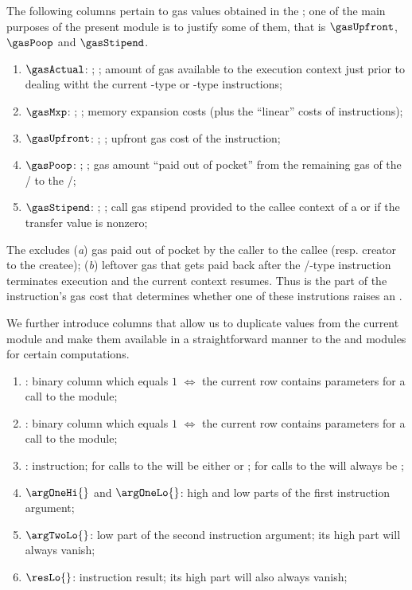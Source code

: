 The following columns pertain to gas values obtained in the \hubMod{};
one of the main purposes of the present module is to justify some of them, that is
$\gasUpfront$, $\gasPoop$ and $\gasStipend$.
\begin{enumerate}[resume]
	\item $\gasActual$: \godGiven{};
		\ccc{}; amount of gas available to the execution context just prior to dealing witht the current -type or -type instructions;
	\item $\gasMxp$: \godGiven{};
		\ccc{}; memory expansion costs (plus the ``linear'' costs of  instructions);
	\item $\gasUpfront$: \godGiven{};
		\ccc{}; upfront gas cost of the instruction;
	\item $\gasPoop$: \godGiven{};
		\ccc{}; gas amount ``paid out of pocket'' from the remaining gas of the \callerr{}/\creator{} to the \calleee{}/\createe{};	
	\item $\gasStipend$: \godGiven{};
		\ccc{}; call gas stipend provided to the callee context of a  or  if the transfer value is nonzero; 
\end{enumerate}
\saNote{}
The \gasUpfront{} excludes
(\emph{a}) gas paid out of pocket by the caller to the callee (resp. creator to the createe);
(\emph{b}) leftover gas that gets paid back after the /-type instruction terminates execution and the current context resumes.
Thus \gasUpfront{} is the part of the instruction's gas cost that determines whether one of these instrutions raises an \oogxSH{}.

We further introduce columns that allow us to duplicate values from the current module and make them available in a straightforward manner to the \wcpMod{} and \modMod{} modules for certain computations.
\begin{enumerate}[resume]
	\item \wcpLookupFlag{}:
		binary column which equals $1$ $\iff$ the current row contains parameters for a call to the \wcpMod{} module;
	\item \divLookupFlag{}:
		binary column which equals $1$ $\iff$ the current row contains parameters for a call to the \modMod{} module;
	\item \exoInst{}:
		instruction; for calls to the \wcpMod{} will be either  or ; for calls to the \modMod{} will always be ;
	\item $\argOneHi{}$ and $\argOneLo{}$:
		high and low parts of the first instruction argument;
	\item $\argTwoLo{}$:
		low part of the second instruction argument; its high part will always vanish;
	\item $\resLo{}$:
		instruction result; its high part will also always vanish; 
\end{enumerate}

